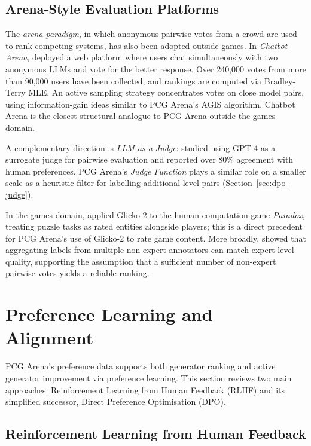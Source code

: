 \documentclass[shortabstract, mgr, english]{iithesis}
\begin{document}
\subsection{Arena-Style Evaluation Platforms}
\label{subsec:bg-arenas}

The \emph{arena paradigm}, in which anonymous pairwise votes from a crowd are used
to rank competing systems, has also been adopted outside games.
In \emph{Chatbot Arena}, \citet{chiang2024chatbot} deployed a web platform where
users chat simultaneously with two anonymous LLMs and vote for the better
response. Over 240,000 votes from more than 90,000 users have been collected, and rankings are
computed via Bradley-Terry MLE. An active sampling strategy concentrates votes on
close model pairs, using information-gain ideas similar to PCG
Arena's AGIS algorithm. Chatbot Arena is the closest structural analogue to PCG
Arena outside the games domain.

A complementary direction is \emph{LLM-as-a-Judge}: \citet{zheng2023judging} studied using GPT-4 as a
surrogate judge for pairwise evaluation and reported over 80\% agreement with human
preferences. PCG Arena's \emph{Judge Function} plays a similar role on a
smaller scale as a heuristic filter for labelling additional level pairs
(Section~\ref{sec:dpo-judge}).

In the games domain, \citet{sarkar2017glicko2} applied Glicko-2 to the human computation game
\emph{Paradox}, treating puzzle tasks as rated entities alongside players;
this is a direct precedent for PCG Arena's use of Glicko-2 to rate
game content.
More broadly, \citet{snow2008cheap} showed that aggregating labels from multiple non-expert
annotators can match expert-level quality, supporting the assumption
that a sufficient number of non-expert pairwise votes yields a reliable ranking.


\section{Preference Learning and Alignment}
\label{sec:bg-alignment}

PCG Arena's preference data supports both generator ranking and active
generator improvement via preference learning. This section reviews two main
approaches: Reinforcement Learning from Human Feedback (RLHF) and its
simplified successor, Direct Preference Optimisation (DPO).

\subsection{Reinforcement Learning from Human Feedback}
\label{subsec:bg-rlhf}
\end{document}
